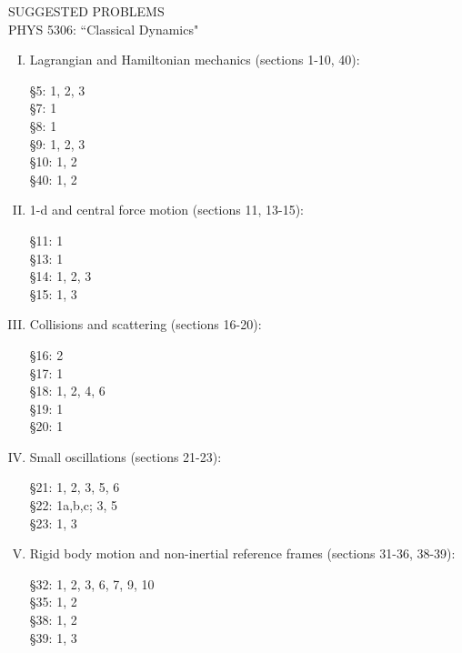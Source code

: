 \documentclass[10pt]{article}
\numberwithin{equation}{section}
\def\ben{\begin{enumerate}}
\def\een{\end{enumerate}}
\def\i{\item{}}
\begin{document}
\begin{center}
SUGGESTED PROBLEMS\\
PHYS 5306: ``Classical Dynamics"\\
\end{center}

\ben[I.]

\i Lagrangian and Hamiltonian mechanics (sections 1-10, 40):

\S 5: 1, 2, 3\\
\S 7: 1\\ 
\S 8: 1\\
\S 9: 1, 2, 3\\ 
\S 10: 1, 2\\
\S 40: 1, 2

\i 1-d and central force motion (sections 11, 13-15):

\S 11: 1\\
\S 13: 1\\
\S 14: 1, 2, 3\\ 
\S 15: 1, 3

\i Collisions and scattering (sections 16-20):

\S 16: 2\\
\S 17: 1\\
\S 18: 1, 2, 4, 6\\
\S 19: 1\\
\S 20: 1

\i Small oscillations (sections 21-23):

\S 21: 1, 2, 3, 5, 6\\
\S 22: 1a,b,c; 3, 5\\
\S 23: 1, 3

\i Rigid body motion and non-inertial reference frames (sections 31-36, 38-39):

\S 32: 1, 2, 3, 6, 7, 9, 10\\
\S 35: 1, 2\\
\S 38: 1, 2\\
\S 39: 1, 3

\een
\end{document}
